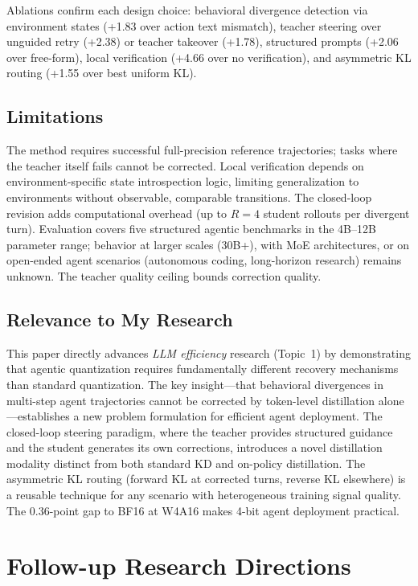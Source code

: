 \documentclass[11pt,a4paper]{article}
\begin{document}
Ablations confirm each design choice: behavioral divergence detection via environment states (+1.83 over action text mismatch), teacher steering over unguided retry (+2.38) or teacher takeover (+1.78), structured prompts (+2.06 over free-form), local verification (+4.66 over no verification), and asymmetric KL routing (+1.55 over best uniform KL).

\subsection{Limitations}
The method requires successful full-precision reference trajectories; tasks where the teacher itself fails cannot be corrected. Local verification depends on environment-specific state introspection logic, limiting generalization to environments without observable, comparable transitions. The closed-loop revision adds computational overhead (up to $R{=}4$ student rollouts per divergent turn). Evaluation covers five structured agentic benchmarks in the 4B--12B parameter range; behavior at larger scales (30B+), with MoE architectures, or on open-ended agent scenarios (autonomous coding, long-horizon research) remains unknown. The teacher quality ceiling bounds correction quality.

\subsection{Relevance to My Research}
This paper directly advances \emph{LLM efficiency} research (Topic~1) by demonstrating that agentic quantization requires fundamentally different recovery mechanisms than standard quantization. The key insight---that behavioral divergences in multi-step agent trajectories cannot be corrected by token-level distillation alone---establishes a new problem formulation for efficient agent deployment. The closed-loop steering paradigm, where the teacher provides structured guidance and the student generates its own corrections, introduces a novel distillation modality distinct from both standard KD and on-policy distillation. The asymmetric KL routing (forward KL at corrected turns, reverse KL elsewhere) is a reusable technique for any scenario with heterogeneous training signal quality. The 0.36-point gap to BF16 at W4A16 makes 4-bit agent deployment practical.

\section{Follow-up Research Directions}
\end{document}
